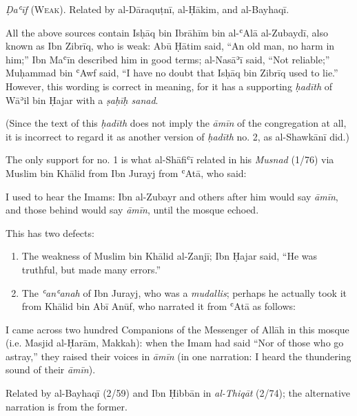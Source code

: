 \emph{Ḍaʿīf} (\textsc{Weak}). Related by al-Dāraquṭnī, al-Ḥākim, and
al-Bayhaqī.

All the above sources contain Isḥāq bin Ibrāhīm bin al-ʿAlā al-Zubaydī,
also known as Ibn Zibrīq, who is weak: Abū Ḥātim said, ``An old man, no
harm in him;'' Ibn Maʿīn described him in good terms; al-Nasāʾī said,
``Not reliable;'' Muḥammad bin ʿAwf said, ``I have no doubt that Isḥāq
bin Zibrīq used to lie.'' However, this wording is correct in meaning,
for it has a supporting \emph{ḥadīth} of Wāʾil bin Ḥajar with a
\emph{ṣaḥīḥ sanad}.

(Since the text of this \emph{ḥadīth} does not imply the \emph{āmīn} of
the congregation at all, it is incorrect to regard it as another version
of \emph{ḥadīth} no. 2, as al-Shawkānī did.)

The only support for no. 1 is what al-Shāfiʿī related in his
\emph{Musnad} (1/76) via Muslim bin Khālid from Ibn Jurayj from ʿAtā,
who said:

\begin{mdframed}[style=narration, frametitle={Narration}]
I used to hear the Imams: Ibn al-Zubayr and others after him would say \textit{āmīn}, and those behind would say \textit{āmīn}, until the mosque echoed.
\end{mdframed}

This has two defects:

\begin{enumerate}
\def\labelenumi{\roman{enumi}.}
\tightlist
\item
  The weakness of Muslim bin Khālid al-Zanjī; Ibn Ḥajar said, ``He was
  truthful, but made many errors.''
\item
  The \emph{ʿanʿanah} of Ibn Jurayj, who was a \emph{mudallis}; perhaps
  he actually took it from Khālid bin Abī Anūf, who narrated it from
  ʿAtā as follows:
\end{enumerate}

\begin{mdframed}[style=narration, frametitle={Narration}]
I came across two hundred Companions of the Messenger of Allāh \pbuh in this mosque (i.e. Masjid al-Ḥarām, Makkah): when the Imam had said “Nor of those who go astray,” they raised their voices in \textit{āmīn} (in one narration: I heard the thundering sound of their \textit{āmīn}).
\end{mdframed}

Related by al-Bayhaqī (2/59) and Ibn Ḥibbān in \emph{al-Thiqāt} (2/74);
the alternative narration is from the former.

